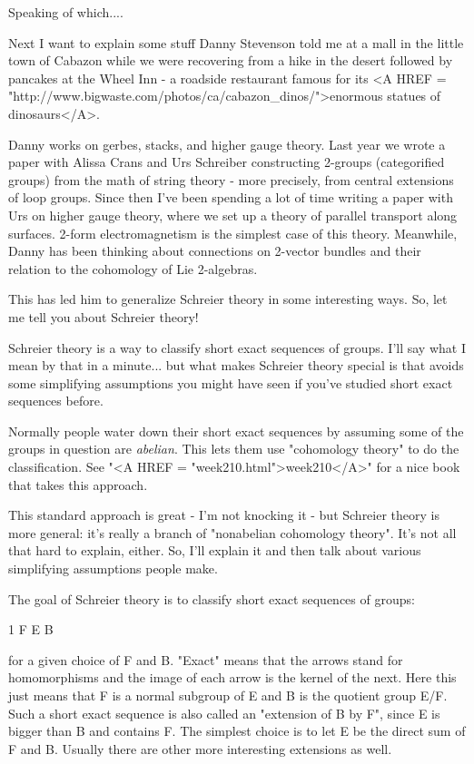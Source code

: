 Speaking of which....

Next I want to explain some stuff Danny Stevenson told me at a mall in the 
little town of Cabazon while we were recovering from a hike in the desert 
followed by pancakes at the Wheel Inn - a roadside restaurant famous for 
its <A HREF = "http://www.bigwaste.com/photos/ca/cabazon_dinos/">enormous 
statues of dinosaurs</A>.

Danny works on gerbes, stacks, and higher gauge theory.  Last year we
wrote a paper with Alissa Crans and Urs Schreiber constructing 2-groups
(categorified groups) from the math of string theory - more precisely, 
from central extensions of loop groups.  Since then I've been spending a 
lot of time writing a paper with Urs on higher gauge theory, where we set 
up a theory of parallel transport along surfaces.  2-form electromagnetism
is the simplest case of this theory.  Meanwhile, Danny has been thinking 
about connections on 2-vector bundles and their relation to the cohomology 
of Lie 2-algebras. 

This has led him to generalize Schreier theory in some interesting ways.  
So, let me tell you about Schreier theory! 

Schreier theory is a way to classify short exact sequences of groups.
I'll say what I mean by that in a minute... but what makes Schreier theory
special is that avoids some simplifying assumptions you might have seen 
if you've studied short exact sequences before.

Normally people water down their short exact sequences by assuming some 
of the groups in question are \emph{abelian}.  
This lets them use "cohomology 
theory" to do the classification.
See "<A HREF = "week210.html">week210</A>" 
for a nice book that takes this approach.

This standard approach is great - I'm not knocking it - but Schreier theory 
is more general: it's really a branch of "nonabelian cohomology theory".   
It's not all that hard to explain, either.  So, I'll explain it and then 
talk about various simplifying assumptions people make.

The goal of Schreier theory is to classify short exact sequences of groups:

1 \to  F \to  E \to  B 

for a given choice of F and B.  "Exact" means that the arrows stand 
for homomorphisms and the image of each arrow is the kernel of the next.  
Here this just means that F is a normal subgroup of E and B is the quotient 
group E/F.  Such a short exact sequence is also called an "extension of B 
by F", since E is bigger than B and contains F.  The simplest choice is to 
let E be the direct sum of F and B.  Usually there are other more interesting
extensions as well.

